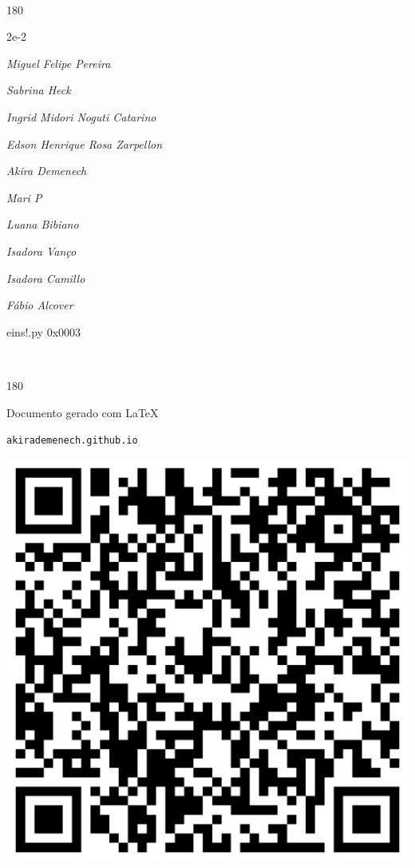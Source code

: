 \documentclass[12pt]{article}
\begin{document}
	\ 
	\vfill
	\begin{turn}{180}	
		\begin{minipage}{\textwidth}
		  	\ttfamily %
			\centering
			{\Huge 2e-2}
		  
			\hfill
		  
			

\textit{\small Miguel Felipe Pereira}

\textit{\small Sabrina Heck}

\textit{\small Ingrid Midori Noguti Catarino}

\textit{\small Edson Henrique Rosa Zarpellon}

\textit{\small Akira Demenech}

\textit{\small Mari P}

\textit{\small Luana Bibiano}

\textit{\small Isadora Vanço}

\textit{\small Isadora Camillo}

\textit{\small Fábio Alcover}

\bigskip

eins!.py
0x0003


		\end{minipage}	
	\end{turn}
	\vfill
	\

\pagebreak

	\begin{turn}{180}	
		\begin{minipage}{\textwidth}		  
		  Documento gerado com \LaTeX			
		  
		  \texttt{akirademenech.github.io}

		  \includegraphics[height=0.3\textheight]{2e-2.pdf}

		\end{minipage}	
	\end{turn}  
		  
\end{document}
